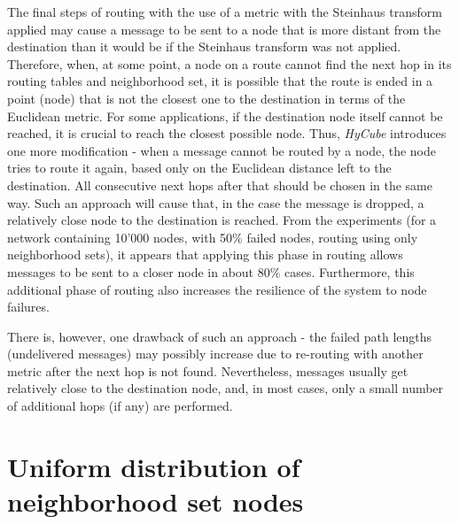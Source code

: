 The final steps of routing with the use of a metric with the Steinhaus transform applied may cause a message to be sent to a node that is more distant from the destination than it would be if the Steinhaus transform was not applied. Therefore, when, at some point, a node on a route cannot find the next hop in its routing tables and neighborhood set, it is possible that the route is ended in a point (node) that is not the closest one to the destination in terms of the Euclidean metric. For some applications, if the destination node itself cannot be reached, it is crucial to reach the closest possible node. Thus, \emph{HyCube} introduces one more modification - when a message cannot be routed by a node, the node tries to route it again, based only on the Euclidean distance left to the destination. All consecutive next hops after that should be chosen in the same way. Such an approach will cause that, in the case the message is dropped, a relatively close node to the destination is reached. From the experiments (for a network containing 10'000 nodes, with 50\% failed nodes, routing using only neighborhood sets), it appears that applying this phase in routing allows messages to be sent to a closer node in about 80\% cases. Furthermore, this additional phase of routing also increases the resilience of the system to node failures.

There is, however, one drawback of such an approach - the failed path lengths (undelivered messages) may possibly increase due to re-routing with another metric after the next hop is not found. Nevertheless, messages usually get relatively close to the destination node, and, in most cases, only a small number of additional hops (if any) are performed.






\section {Uniform distribution of neighborhood set nodes}
\label{sec:uniformNSDistribution}

